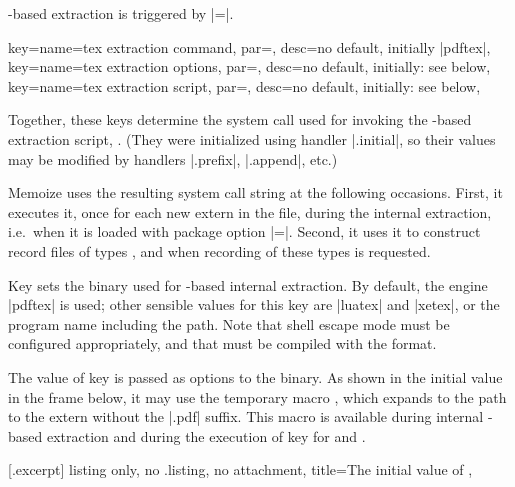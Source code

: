 \documentclass[a4paper,11pt]{article}
\begin{document}
-based extraction is triggered by
|=|.

\begin{doc}{
    key={name=tex extraction command, par=,
      desc={no default, initially |pdftex|}},
    key={name=tex extraction options, par=,
      desc={no default, initially: see below}},
    key={name=tex extraction script, par=,
      desc={no default, initially: see below}},
  }
  
  Together, these keys determine the system call used for invoking the
  -based extraction script, .
  (They were initialized using  handler |.initial|, so their
  values may be modified by handlers |.prefix|, |.append|, etc.)

  Memoize uses the resulting system call string at the following occasions.
  First, it executes it, once for each new extern in the \dmmz file, during the
  internal extraction, i.e.\ when it is loaded with package option
  |=|.  Second, it uses it to construct
  record files of types ,  and
   when recording of these types is requested.
  
  Key  sets the  binary used for
  -based internal extraction.  By default, the 
  engine |pdftex| is used; other sensible values for this key are |luatex| and
  |xetex|, or the program name including the path.  Note that shell escape mode
  must be configured appropriately, and that
   must be compiled with the
   format.

  The value of key  is passed as options to the
   binary.  As shown in the initial value in the frame below,
  it may use the temporary macro , which expands to
  the path to the extern without the |.pdf| suffix.  This macro is available
  during internal -based extraction and during the execution of
   key for and .

  [.excerpt]{%
    listing only, no .listing, no attachment, title={The initial value of
      },
  }


\end{doc}
\end{document}
